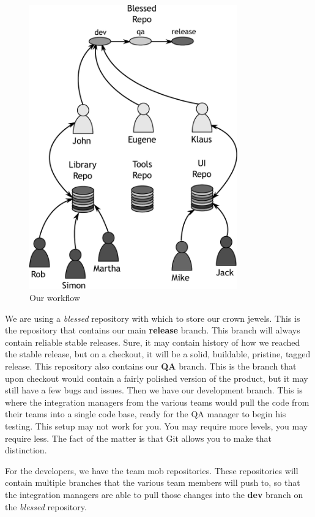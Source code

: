 \begin{figure}[hbt]
\centering
\includegraphics[width=9cm]{images/f-w7-d1.pdf}
\caption{Our workflow}
\end{figure}

We are using a \emph{blessed} repository with which to store our crown jewels.
This is the repository that contains our main \textbf{release} branch.
This branch will always contain reliable stable releases.
Sure, it may contain history of how we reached the stable release, but on a checkout, it will be a solid, buildable, pristine, tagged release.
This repository also contains our \textbf{QA} branch.
This is the branch that upon checkout would contain a fairly polished version of the product, but it may still have a few bugs and issues.
Then we have our development branch.
This is where the integration managers from the various teams would pull the code from their teams into a single code base, ready for the QA manager to begin his testing.
This setup may not work for you.
You may require more levels, you may require less.
The fact of the matter is that Git allows you to make that distinction.

For the developers, we have the team mob repositories.
These repositories will contain multiple branches that the various team members will push to, so that the integration managers are able to pull those changes into the \textbf{dev} branch on the \emph{blessed} repository.

